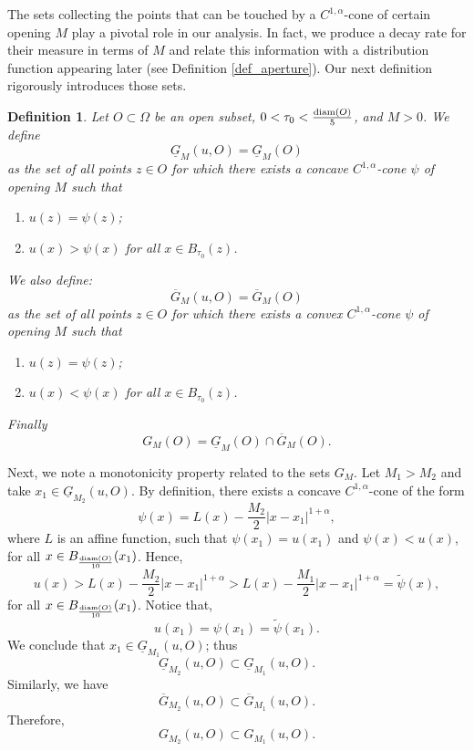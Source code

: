 \documentclass[10pt]{article} %
\newtheorem{Definition}{Definition}
\begin{document}
The sets collecting the points that can be touched by a $ C ^{1,\alpha}$-cone of certain opening $M$ play a pivotal role in our analysis. In fact, we produce a decay rate for their measure in terms of $M$ and relate this information with a distribution function appearing later (see Definition \ref{def_aperture}). Our next definition rigorously introduces those sets.

\begin{Definition}
Let $O \subset \Omega$ be an open subset, $0<\tau_0<\frac{{\rm diam}(O)}{5}$, and $M > 0$. We define
\[
	\underline{G}_M(u, O) = \underline{G}_M(O)
\]
as the set of all points $z \in O$ for which there exists a concave $ C ^{1,\alpha}$-cone $\psi$ of opening $M$ such that 
\begin{enumerate}
	\item $u(z) = \psi(z)$;
	\item $u(x) > \psi(x)$ for all $x \in B_{\tau_0}(z)$.
\end{enumerate}
We also define:
\[
	\overline{G}_M(u, O) = \overline{G}_M(O)
\]
as the set of all points $z \in O$ for which there exists a convex $ C ^{1,\alpha}$-cone $\psi$ of opening $M$ such that
\begin{enumerate}
	\item $u(z) = \psi(z)$;
	\item $u(x) < \psi(x)$ for all $x \in B_{\tau_0}(z)$.
\end{enumerate}

Finally 
\[
G_M(O) = \underline{G}_M(O)\cap \overline{G}_M(O).
\]
\end{Definition}

Next, we note a monotonicity property related to the sets $G_M$. Let $M_1 > M_2$ and take $x_1 \in \underline{G}_{M_2}(u,O)$. By definition, there exists a concave $ C ^{1,\alpha}$-cone of the form
\[
	\psi(x) = L(x) - \frac{M_2}{2}|x - x_1|^{1+\alpha},
\] 
where $L$ is an affine function, such that $\psi(x_1) = u(x_1)$ and $\psi(x) < u(x)$, for all $x \in B_{\frac{{\rm diam}(O)}{10}}(x_1)$. Hence,
\[
	u(x) > L(x) - \frac{M_2}{2}|x - x_1|^{1+\alpha} > L(x) - \frac{M_1}{2}|x - x_1|^{1+\alpha}= \tilde{\psi}(x),
\]
for all $x \in B_{\frac{{\rm diam}(O)}{10}}(x_1)$. Notice that, 
\[
u(x_1) = \psi(x_1) = \tilde{\psi}(x_1).
\] 
We conclude that $x_1 \in \underline{G}_{M_1}(u,O)$; thus
\[
\underline{G}_{M_2}(u,O) \subset \underline{G}_{M_1}(u,O).
\]
Similarly, we have
\[
\overline{G}_{M_2}(u,O) \subset \overline{G}_{M_1}(u,O).
\]
Therefore,
\[
G_{M_2}(u,O) \subset G_{M_1}(u,O).
\]
\end{document}
